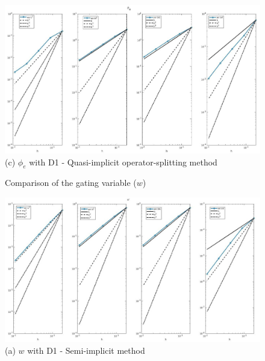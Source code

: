 \documentclass[a4paper,11pt]{article}
\begin{document}
\begin{figure}[h]
\begin{center}
\includegraphics[width =\textwidth]{./D1_Phie_1_OS.jpg}
\caption*{(c) $\phi_e$ with D1 - Quasi-implicit operator-splitting method}
\end{center}
\end{figure}

\begin{figure}[H]
\caption{Comparison of the gating variable ($w$)}
\label{w-time}
\begin{center}
\includegraphics[width = \textwidth]{./D1_w_1.jpg}
\caption*{(a) $w$ with D1 - Semi-implicit method}
\end{center}
\end{figure}
\newpage
\end{document}
